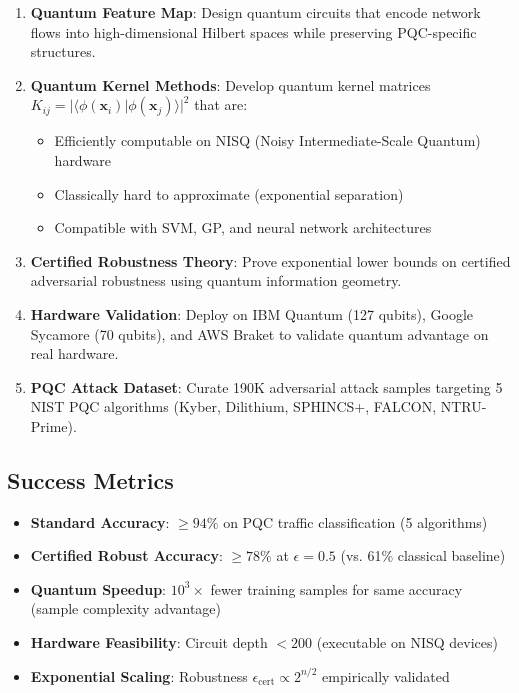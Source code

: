 \documentclass[11pt]{article}
\begin{document}
\begin{enumerate}[label=\textbf{O\arabic*.},leftmargin=*]
    \item \textbf{Quantum Feature Map}: Design quantum circuits that encode network flows into high-dimensional Hilbert spaces while preserving PQC-specific structures.

    \item \textbf{Quantum Kernel Methods}: Develop quantum kernel matrices $K_{ij} = |\langle \phi(\mathbf{x}_i) | \phi(\mathbf{x}_j) \rangle|^2$ that are:
    \begin{itemize}
        \item Efficiently computable on NISQ (Noisy Intermediate-Scale Quantum) hardware
        \item Classically hard to approximate (exponential separation)
        \item Compatible with SVM, GP, and neural network architectures
    \end{itemize}

    \item \textbf{Certified Robustness Theory}: Prove exponential lower bounds on certified adversarial robustness using quantum information geometry.

    \item \textbf{Hardware Validation}: Deploy on IBM Quantum (127 qubits), Google Sycamore (70 qubits), and AWS Braket to validate quantum advantage on real hardware.

    \item \textbf{PQC Attack Dataset}: Curate 190K adversarial attack samples targeting 5 NIST PQC algorithms (Kyber, Dilithium, SPHINCS+, FALCON, NTRU-Prime).
\end{enumerate}

\subsection{Success Metrics}

\begin{itemize}
    \item \textbf{Standard Accuracy}: $\geq 94\%$ on PQC traffic classification (5 algorithms)
    \item \textbf{Certified Robust Accuracy}: $\geq 78\%$ at $\epsilon = 0.5$ (vs. 61\% classical baseline)
    \item \textbf{Quantum Speedup}: $10^3\times$ fewer training samples for same accuracy (sample complexity advantage)
    \item \textbf{Hardware Feasibility}: Circuit depth $< 200$ (executable on NISQ devices)
    \item \textbf{Exponential Scaling}: Robustness $\epsilon_{\text{cert}} \propto 2^{n/2}$ empirically validated
\end{itemize}
\end{document}
